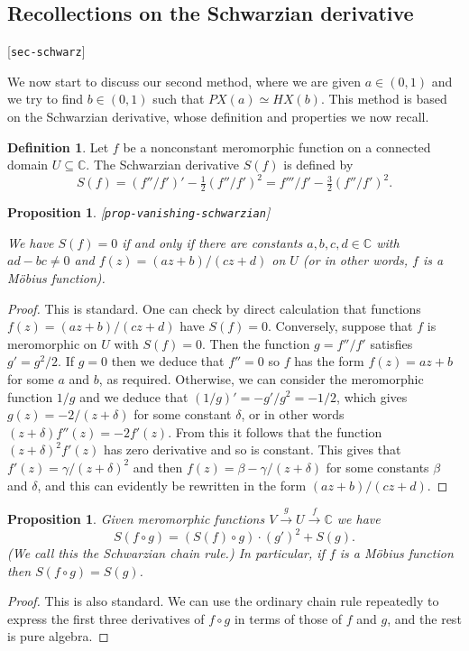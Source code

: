 \documentclass[reqno]{amsart}
\newcommand{\lbl}[1]{\label{#1}\textup{[\texttt{#1}]}\par}
\newcommand{\lbl}{\label}
\newcommand{\bt}        {\beta}
\newcommand{\gm}        {\gamma}
\newcommand{\dl}        {\delta}
\newcommand{\xra}       {\xrightarrow}
\newcommand{\C}         {{\mathbb{C}}}
\newcommand{\sse}       {\subseteq}
\renewcommand{\:}{\colon}
\newtheorem{proposition}[theorem]{Proposition}
\theoremstyle{definition}
\newtheorem{definition}[theorem]{Definition}
\begin{document}
\subsection{Recollections on the Schwarzian derivative}
\lbl{sec-schwarz}

We now start to discuss our second method, where we are given
$a\in(0,1)$ and we try to find $b\in (0,1)$ such that
$PX(a)\simeq HX(b)$.  This method is based on the Schwarzian
derivative, whose definition and properties we now recall.

\begin{definition}
 Let $f$ be a nonconstant meromorphic function on a connected domain
 $U\sse\C$.  The Schwarzian derivative $S(f)$ is defined by
 \[ S(f) = (f''/f')' - \tfrac{1}{2} (f''/f')^2
         = f'''/f' - \tfrac{3}{2} (f''/f')^2.
 \]
\end{definition}

\begin{proposition}\lbl{prop-vanishing-schwarzian}
 We have $S(f)=0$ if and only if there are constants $a,b,c,d\in\C$
 with $ad-bc\neq 0$ and $f(z)=(az+b)/(cz+d)$ on $U$ (or in other
 words, $f$ is a M\"obius function).
\end{proposition}
\begin{proof}
 This is standard.  One can check by direct calculation that
 functions $f(z)=(az+b)/(cz+d)$ have $S(f)=0$.  Conversely, suppose
 that $f$ is meromorphic on $U$ with $S(f)=0$.  Then the function
 $g=f''/f'$ satisfies $g'=g^2/2$.  If $g=0$ then we deduce that
 $f''=0$ so $f$ has the form $f(z)=az+b$ for some $a$ and $b$, as
 required.  Otherwise, we can consider the meromorphic function $1/g$
 and we deduce that $(1/g)'=-g'/g^2=-1/2$, which gives
 $g(z)=-2/(z+\dl)$ for some constant $\dl$, or in other words
 $(z+\dl)f''(z)=-2f'(z)$.  From this it follows that the function
 $(z+\dl)^2f'(z)$ has zero derivative and so is constant.  This gives
 that $f'(z)=\gm/(z+\dl)^2$ and then $f(z)=\bt-\gm/(z+\dl)$ for some
 constants $\bt$ and $\dl$, and this can evidently be rewritten in the
 form $(az+b)/(cz+d)$.
\end{proof}

\begin{proposition}
 Given meromorphic functions $V\xra{g}U\xra{f}\C$ we have
 \[ S(f\circ g) = (S(f)\circ g) \cdot (g')^2 + S(g). \]
 (We call this the \emph{Schwarzian chain rule}.)  In particular, if
 $f$ is a M\"obius function then $S(f\circ g)=S(g)$.
\end{proposition}
\begin{proof}
 This is also standard.  We can use the ordinary chain rule repeatedly to
 express the first three derivatives of $f\circ g$ in terms of those
 of $f$ and $g$, and the rest is pure algebra.
\end{proof}
\end{document}
